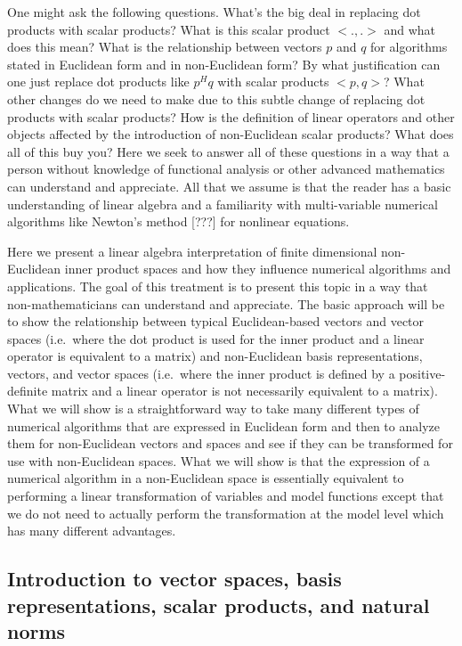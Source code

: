 One might ask the following questions.  What's the big deal in replacing dot
products with scalar products?  What is this scalar product $<.,.>$ and what
does this mean?  What is the relationship between vectors $p$ and $q$ for
algorithms stated in Euclidean form and in non-Euclidean form?  By what
justification can one just replace dot products like $p^H q$ with scalar
products $<p,q>$?  What other changes do we need to make due to this subtle
change of replacing dot products with scalar products?  How is the definition
of linear operators and other objects affected by the introduction of
non-Euclidean scalar products?  What does all of this buy you?  Here we seek
to answer all of these questions in a way that a person without knowledge of
functional analysis or other advanced mathematics can understand and
appreciate.  All that we assume is that the reader has a basic understanding
of linear algebra and a familiarity with multi-variable numerical algorithms
like Newton's method [???] for nonlinear equations.

Here we present a linear algebra interpretation of finite dimensional
non-Euclidean inner product spaces and how they influence numerical algorithms
and applications.  The goal of this treatment is to present this topic in a
way that non-mathematicians can understand and appreciate.  The basic approach
will be to show the relationship between typical Euclidean-based vectors and
vector spaces (i.e.\ where the dot product is used for the inner product and a
linear operator is equivalent to a matrix) and non-Euclidean basis
representations, vectors, and vector spaces (i.e.\ where the inner product is
defined by a positive-definite matrix and a linear operator is not necessarily
equivalent to a matrix).  What we will show is a straightforward way to take
many different types of numerical algorithms that are expressed in Euclidean
form and then to analyze them for non-Euclidean vectors and spaces and see if
they can be transformed for use with non-Euclidean spaces.  What we will show
is that the expression of a numerical algorithm in a non-Euclidean space is
essentially equivalent to performing a linear transformation of variables and
model functions except that we do not need to actually perform the
transformation at the model level which has many different advantages.

\subsection{Introduction to vector spaces, basis representations, scalar products, and natural norms}

